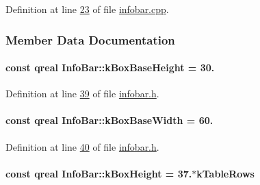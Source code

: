 Definition at line \hyperlink{infobar_8cpp_source_l00023}{23} of file \hyperlink{infobar_8cpp_source}{infobar.\+cpp}.



\subsubsection{Member Data Documentation}
\hypertarget{class_info_bar_a28fb5e5d6d399d9327f67aa768d4a3d8}{}
\paragraph[{k\+Box\+Base\+Height}]{\setlength{\rightskip}{0pt plus 5cm}const qreal Info\+Bar\+::k\+Box\+Base\+Height = 30.\hspace{0.3cm}{\ttfamily [static]}}\label{class_info_bar_a28fb5e5d6d399d9327f67aa768d4a3d8}


Definition at line \hyperlink{infobar_8h_source_l00039}{39} of file \hyperlink{infobar_8h_source}{infobar.\+h}.

\hypertarget{class_info_bar_acb9c812df3577ae628cec2e149c9dd0a}{}
\paragraph[{k\+Box\+Base\+Width}]{\setlength{\rightskip}{0pt plus 5cm}const qreal Info\+Bar\+::k\+Box\+Base\+Width = 60.\hspace{0.3cm}{\ttfamily [static]}}\label{class_info_bar_acb9c812df3577ae628cec2e149c9dd0a}


Definition at line \hyperlink{infobar_8h_source_l00040}{40} of file \hyperlink{infobar_8h_source}{infobar.\+h}.

\hypertarget{class_info_bar_aba381a3838a5e064f1372f2f2b4d8e0d}{}
\paragraph[{k\+Box\+Height}]{\setlength{\rightskip}{0pt plus 5cm}const qreal Info\+Bar\+::k\+Box\+Height = 37.$\ast${\bf k\+Table\+Rows}\hspace{0.3cm}{\ttfamily [static]}}\label{class_info_bar_aba381a3838a5e064f1372f2f2b4d8e0d}


